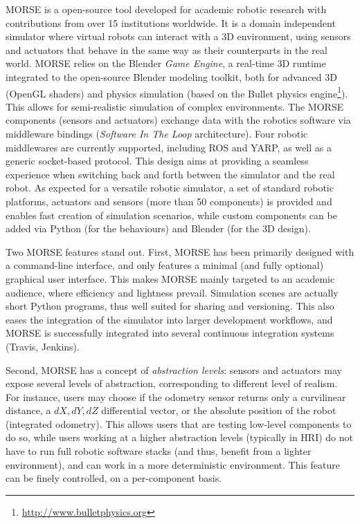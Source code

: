 \documentclass[letterpaper, 10pt, conference]{ieeeconf}
\begin{document}
MORSE is a open-source tool developed for academic robotic research with
contributions from over 15 institutions worldwide. It is a domain independent
simulator where virtual robots can interact with a 3D environment, using sensors
and actuators that behave in the same way as their counterparts in the real
world. MORSE relies on the Blender \emph{Game Engine}, a real-time 3D runtime
integrated to the open-source Blender modeling toolkit, both for advanced 3D
(OpenGL shaders) and physics simulation (based on the {\sc Bullet} physics
engine\footnote{\url{http://www.bulletphysics.org}}). This allows for semi-realistic simulation of complex environments.
The MORSE components (sensors and actuators) exchange data with the robotics
software via middleware bindings (\emph{Software In The Loop} architecture).
Four robotic middlewares are currently supported, including ROS and YARP, as
well as a generic socket-based protocol. This design aims at providing a
seamless experience when switching back and forth between the simulator and the
real robot. As expected for a versatile robotic simulator, a set of standard
robotic platforms, actuators and sensors (more than 50 components) is
provided and enables fast creation of simulation scenarios, while custom
components can be added via Python (for the behaviours) and Blender (for the 3D
design).

Two MORSE features stand out. First, MORSE has been primarily designed with a
command-line interface, and only features a minimal (and fully optional)
graphical user interface. This makes MORSE mainly targeted to an academic
audience, where efficiency and lightness prevail.  Simulation scenes are
actually short Python programs, thus well suited for sharing and versioning.
This also eases the integration of the simulator into larger development
workflows, and MORSE is successfully integrated into several continuous
integration systems (Travis, Jenkins).

Second, MORSE has a concept of \emph{abstraction levels}: sensors and actuators
may expose several levels of abstraction, corresponding to different level of
realism. For instance, users may choose if the odometry sensor returns only a
curvilinear distance, a $dX, dY, dZ$ differential vector, or the absolute
position of the robot (integrated odometry). This allows users that are testing
low-level components to do so, while users working at a higher abstraction
levels (typically in HRI) do not have to run full robotic software stacks (and
thus, benefit from a lighter environment), and can work in a more deterministic
environment. This feature can be finely controlled, on a per-component basis.
\end{document}
